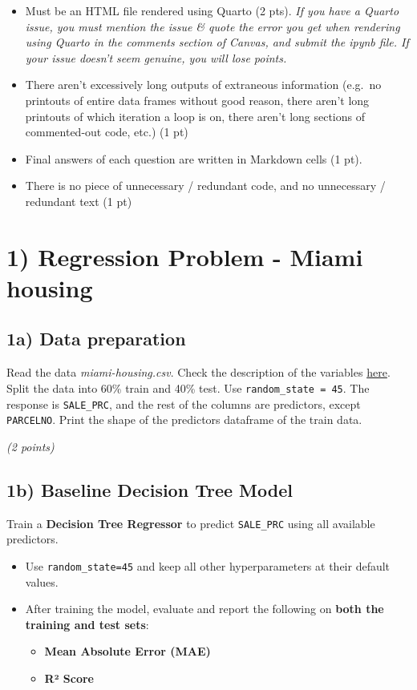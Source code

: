 \documentclass[
  letterpaper,
  DIV=11,
  numbers=noendperiod]{scrreprt}
\providecommand{\tightlist}{%
  \setlength{\itemsep}{0pt}\setlength{\parskip}{0pt}}\usepackage{longtable,booktabs,array}
\begin{document}
\begin{itemize}
\tightlist
\item
  Must be an HTML file rendered using Quarto (2 pts). \emph{If you have
  a Quarto issue, you must mention the issue \& quote the error you get
  when rendering using Quarto in the comments section of Canvas, and
  submit the ipynb file. If your issue doesn't seem genuine, you will
  lose points.}
\item
  There aren't excessively long outputs of extraneous information
  (e.g.~no printouts of entire data frames without good reason, there
  aren't long printouts of which iteration a loop is on, there aren't
  long sections of commented-out code, etc.) (1 pt)
\item
  Final answers of each question are written in Markdown cells (1 pt).
\item
  There is no piece of unnecessary / redundant code, and no unnecessary
  / redundant text (1 pt)
\end{itemize}

\section{1) Regression Problem - Miami
housing}\label{regression-problem---miami-housing}

\subsection{1a) Data preparation}\label{a-data-preparation}

Read the data \emph{miami-housing.csv}. Check the description of the
variables
\href{https://www.kaggle.com/datasets/deepcontractor/miami-housing-dataset}{here}.
Split the data into 60\% train and 40\% test. Use
\texttt{random\_state\ =\ 45}. The response is \texttt{SALE\_PRC}, and
the rest of the columns are predictors, except \texttt{PARCELNO}. Print
the shape of the predictors dataframe of the train data.

\emph{(2 points)}

\subsection{1b) Baseline Decision Tree
Model}\label{b-baseline-decision-tree-model}

Train a \textbf{Decision Tree Regressor} to predict \texttt{SALE\_PRC}
using all available predictors.

\begin{itemize}
\tightlist
\item
  Use \texttt{random\_state=45} and keep all other hyperparameters at
  their default values.
\item
  After training the model, evaluate and report the following on
  \textbf{both the training and test sets}:

  \begin{itemize}
  \tightlist
  \item
    \textbf{Mean Absolute Error (MAE)}
  \item
    \textbf{R² Score}
  \end{itemize}
\end{itemize}
\end{document}
